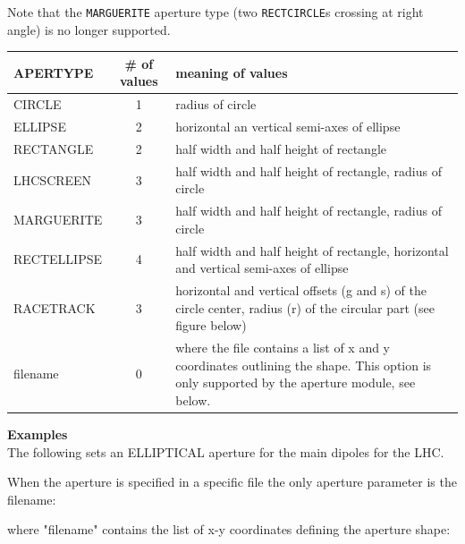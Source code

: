 Note that the {\tt MARGUERITE} aperture type (two {\tt RECTCIRCLE}s 
crossing
at right angle) is no longer supported. 

\begin{tabular}{|l | c | p{9cm}|}
\hline 
\textbf{APERTYPE} & \textbf{\# of values} & \textbf{meaning of
  values} \\  
\hline
CIRCLE & 1 &  radius of circle \\ 
\hline
ELLIPSE & 2 & horizontal an vertical semi-axes of ellipse \\  
\hline
RECTANGLE & 2 & half width and half height of rectangle\\ 
\hline
LHCSCREEN & 3 & half width and half height of rectangle, radius of circle\\  
\hline
MARGUERITE & 3 & half width and half height of rectangle, radius of circle\\  
\hline
RECTELLIPSE & 4 & half width and half height of rectangle, horizontal
and vertical semi-axes of ellipse \\  
\hline
RACETRACK & 3 & horizontal and vertical offsets (g and s) of the circle center,
radius (r) of the circular part (see figure below)\\  
\hline
filename & 0 & where the file contains a list of x and y coordinates
outlining the shape. This option is only supported by the aperture
module, see below. \\  
\hline
\end{tabular}


{\bf Examples}\\
The following sets an ELLIPTICAL aperture for the main
dipoles for the LHC.

When the aperture is specified in a specific file the only aperture
parameter is the filename: 

where "filename" contains the list of x-y coordinates defining the
aperture shape:

